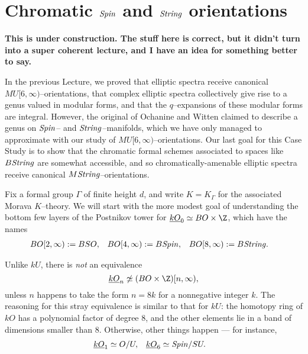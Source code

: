 \section{Chromatic \texorpdfstring{$\mathit{Spin}$}{Spin} and \texorpdfstring{$\mathit{String}$}{String} orientations}

\begin{center}
\textbf{\Large This is under construction.  The stuff here is correct, but it didn't turn into a super coherent lecture, and I have an idea for something better to say.}
\end{center}

In the previous Lecture, we proved that elliptic spectra receive canonical $MU[6, \infty)$--orientations, that complex elliptic spectra collectively give rise to a genus valued in modular forms, and that the $q$--expansions of these modular forms are integral.  However, the original  of Ochanine and Witten claimed to describe a genus on $\mathit{Spin}$-- and $\mathit{String}$--manifolds, which we have only managed to approximate with our study of $MU[6, \infty)$--orientations.  Our last goal for this Case Study is to show that the chromatic formal schemes associated to spaces like $B\mathit{String}$ are somewhat accessible, and so chromatically-amenable elliptic spectra receive canonical $M\mathit{String}$--orientations.

Fix a formal group $\Gamma$ of finite height $d$, and write $K = K_\Gamma$ for the associated Morava $K$--theory.  We will start with the more modest goal of understanding the bottom few layers of the Postnikov tower for $\OS{kO}{0} \simeq BO \times \Z$, which have the names
\begin{align*}
BO[2, \infty) & := BSO, &
BO[4, \infty) & := B\mathit{Spin}, &
BO[8, \infty) & := B\mathit{String}.
\end{align*}

\begin{remark}
Unlike $kU$, there is \emph{not} an equivalence \[\OS{kO}{n} \not\simeq (BO \times \Z)[n, \infty),\] unless $n$ happens to take the form $n = 8k$ for a nonnegative integer $k$.  The reasoning for this stray equivalence is similar to that for $kU$: the homotopy ring of $kO$ has a polynomial factor of degree $8$, and the other elements lie in a band of dimensions smaller than $8$.  Otherwise, other things happen --- for instance,
\begin{align*}
\underline{\smash{kO}}_{1} & \simeq O/U, &
\underline{\smash{kO}}_{6} & \simeq \mathit{Spin} / SU.
\end{align*}
\end{remark}

